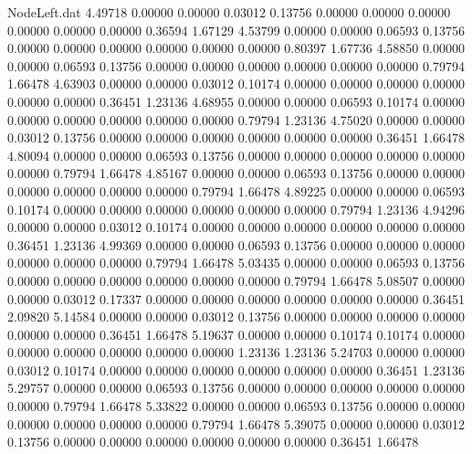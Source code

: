 \begin{filecontents}{NodeLeft.dat}
   4.49718    0.00000    0.00000     0.03012    0.13756    0.00000    0.00000    0.00000    0.00000    0.00000    0.00000    0.36594    1.67129
   4.53799    0.00000    0.00000     0.06593    0.13756    0.00000    0.00000    0.00000    0.00000    0.00000    0.00000    0.80397    1.67736
   4.58850    0.00000    0.00000     0.06593    0.13756    0.00000    0.00000    0.00000    0.00000    0.00000    0.00000    0.79794    1.66478
   4.63903    0.00000    0.00000     0.03012    0.10174    0.00000    0.00000    0.00000    0.00000    0.00000    0.00000    0.36451    1.23136
   4.68955    0.00000    0.00000     0.06593    0.10174    0.00000    0.00000    0.00000    0.00000    0.00000    0.00000    0.79794    1.23136
   4.75020    0.00000    0.00000     0.03012    0.13756    0.00000    0.00000    0.00000    0.00000    0.00000    0.00000    0.36451    1.66478
   4.80094    0.00000    0.00000     0.06593    0.13756    0.00000    0.00000    0.00000    0.00000    0.00000    0.00000    0.79794    1.66478
   4.85167    0.00000    0.00000     0.06593    0.13756    0.00000    0.00000    0.00000    0.00000    0.00000    0.00000    0.79794    1.66478
   4.89225    0.00000    0.00000     0.06593    0.10174    0.00000    0.00000    0.00000    0.00000    0.00000    0.00000    0.79794    1.23136
   4.94296    0.00000    0.00000     0.03012    0.10174    0.00000    0.00000    0.00000    0.00000    0.00000    0.00000    0.36451    1.23136
   4.99369    0.00000    0.00000     0.06593    0.13756    0.00000    0.00000    0.00000    0.00000    0.00000    0.00000    0.79794    1.66478
   5.03435    0.00000    0.00000     0.06593    0.13756    0.00000    0.00000    0.00000    0.00000    0.00000    0.00000    0.79794    1.66478
   5.08507    0.00000    0.00000     0.03012    0.17337    0.00000    0.00000    0.00000    0.00000    0.00000    0.00000    0.36451    2.09820
   5.14584    0.00000    0.00000     0.03012    0.13756    0.00000    0.00000    0.00000    0.00000    0.00000    0.00000    0.36451    1.66478
   5.19637    0.00000    0.00000     0.10174    0.10174    0.00000    0.00000    0.00000    0.00000    0.00000    0.00000    1.23136    1.23136
   5.24703    0.00000    0.00000     0.03012    0.10174    0.00000    0.00000    0.00000    0.00000    0.00000    0.00000    0.36451    1.23136
   5.29757    0.00000    0.00000     0.06593    0.13756    0.00000    0.00000    0.00000    0.00000    0.00000    0.00000    0.79794    1.66478
   5.33822    0.00000    0.00000     0.06593    0.13756    0.00000    0.00000    0.00000    0.00000    0.00000    0.00000    0.79794    1.66478
   5.39075    0.00000    0.00000     0.03012    0.13756    0.00000    0.00000    0.00000    0.00000    0.00000    0.00000    0.36451    1.66478

\end{filecontents}
